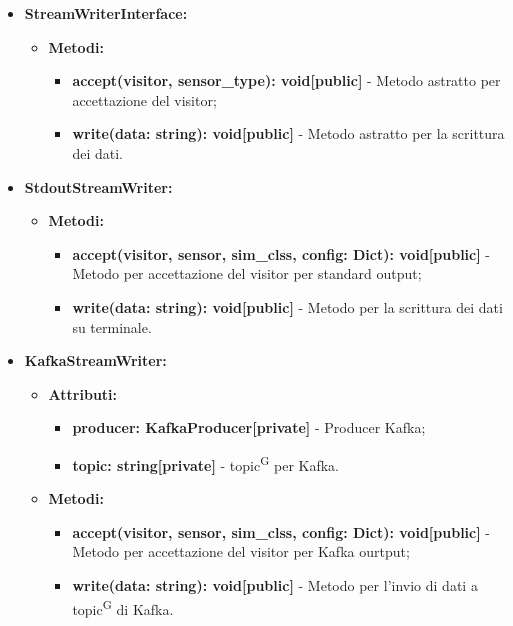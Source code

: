\documentclass[8pt]{article}
\newcommand{\glossterm}[1]{#1\textsuperscript{G}} %
\begin{document}
\begin{itemize}
	\setlength\itemsep{0em}
    \item \textbf{StreamWriterInterface:}
    \begin{itemize}
	\setlength\itemsep{0em}
        \item \textbf{Metodi:}
        \begin{itemize}
	\setlength\itemsep{0em}
            \item \textbf{accept(visitor, sensor\_type): void[public]} - Metodo astratto per accettazione del visitor;
            \item \textbf{write(data: string): void[public]} - Metodo astratto per la scrittura dei dati.
        \end{itemize}
    \end{itemize}
    \item \textbf{StdoutStreamWriter:}
    \begin{itemize}
	\setlength\itemsep{0em}
        \item \textbf{Metodi:}
        \begin{itemize}
	\setlength\itemsep{0em}
            \item \textbf{accept(visitor, sensor, sim\_clss, config: Dict): void[public]} - Metodo per accettazione del visitor per standard output;
            \item \textbf{write(data: string): void[public]} - Metodo per la scrittura dei dati su terminale.
        \end{itemize}
    \end{itemize}
    \item \textbf{KafkaStreamWriter:}
    \begin{itemize}
	\setlength\itemsep{0em}
        \item \textbf{Attributi:}
        \begin{itemize}
	\setlength\itemsep{0em}
            \item \textbf{producer: KafkaProducer[private]} - Producer Kafka;
            \item \textbf{topic: string[private]} - \glossterm{topic} per Kafka.
        \end{itemize}
        \item \textbf{Metodi:}
        \begin{itemize}
	\setlength\itemsep{0em}
            \item \textbf{accept(visitor, sensor, sim\_clss, config: Dict): void[public]} - Metodo per accettazione del visitor per Kafka ourtput;
            \item \textbf{write(data: string): void[public]} - Metodo per l'invio di dati a \glossterm{topic} di Kafka.

\end{itemize}
\end{itemize}
\end{itemize}
\end{document}

